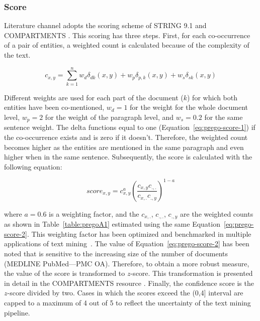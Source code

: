 \subsubsection{Score}

Literature channel adopts the scoring scheme of STRING 9.1 \parencite{franceschini2012string}
and COMPARTMENTS \parencite{binder2014compartments}. This scoring has three steps. 
First, for each co-occurrence of a pair of entities, a weighted count is
calculated because of the complexity of the text.

\begin{equation}
   c_{x,y} = \sum_{k=1}^{n}{w_d \delta_{dk}(x,y) +w_p \delta_{p,k}(x,y) + w_s \delta_{sk}(x,y)}
   \label{eq:prego-score-1}
\end{equation}

Different weights are used for each part of the document ($k$) for which both
entities have been co-mentioned, $w_d = 1$ for the weight for the whole document
level, $w_p = 2$ for the weight of the paragraph level, and $w_s = 0.2$ for the
same sentence weight. 
The delta functions equal to one (Equation~\ref{eq:prego-score-1}) if the co-occurrence
exists and is zero if it doesn't. Therefore, the weighted count becomes higher as
the entities are mentioned in the same paragraph and even higher when in the same sentence.
Subsequently, the score is calculated with the following equation:

\begin{equation}
   score_{x,y} = c_{x,y}^a (\frac{c_{x,y} c_{.,.}}{c_{x, .}c_{.,y}})^{1-a}
   \label{eq:prego-score-2}
\end{equation}

where $a = 0.6$ is a weighting factor, and the $c_{x,.}$, $c_{.,.}$, 
$c_{.,y}$ are the weighted counts as shown in Table~\ref{table:pregoA1} estimated using the same Equation~\ref{eq:prego-score-2}. 
This weighting factor has been optimized and benchmarked in multiple 
applications of text mining~\parencite{franceschini2012string, binder2014compartments, pletscher2015diseases}. 
The value of Equation~\ref{eq:prego-score-2} has been noted that is sensitive to
the increasing size of the number of documents (MEDLINE PubMed—PMC OA).
Therefore, to obtain a more robust measure, the value of the score is transformed to $z$-score. 
This transformation is presented in detail in the COMPARTMENTS resource \parencite{binder2014compartments}. 
Finally, the confidence score is the $z$-score divided by two. Cases in which
the scores exceed the (0,4] interval are capped to a maximum of 4 out of 5 to
reflect the uncertainty of the text mining pipeline.

